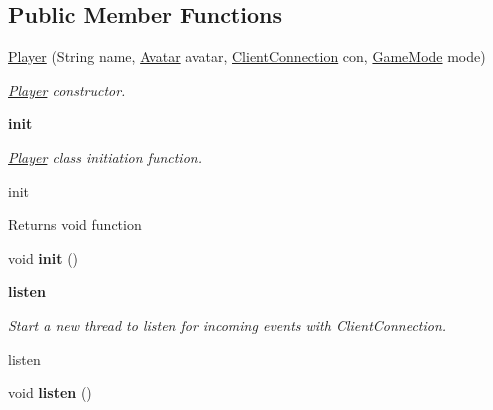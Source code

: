 \subsection*{Public Member Functions}
\begin{DoxyCompactItemize}
\item 
\hyperlink{classbattleship_1_1game_1_1Player_a4461129b3ce0b1bf218b91d05c5c3aa0}{Player} (String name, \hyperlink{classbattleship_1_1screen_1_1Avatar}{Avatar} avatar, \hyperlink{classbattleship_1_1network_1_1ClientConnection}{Client\+Connection} con, \hyperlink{enumbattleship_1_1game_1_1GameMode}{Game\+Mode} mode)
\begin{DoxyCompactList}\small\item\em \hyperlink{classbattleship_1_1game_1_1Player}{Player} constructor. \end{DoxyCompactList}\end{DoxyCompactItemize}
\begin{Indent}{\bf init}\par
{\em \hyperlink{classbattleship_1_1game_1_1Player}{Player} class initiation function.

init

\begin{DoxyReturn}{Returns}
void function 
\end{DoxyReturn}
}\begin{DoxyCompactItemize}
\item 
\hypertarget{classbattleship_1_1game_1_1Player_aa0b2ae0c4d2a3de2b80fe44102962d24}{}void {\bfseries init} ()\label{classbattleship_1_1game_1_1Player_aa0b2ae0c4d2a3de2b80fe44102962d24}

\end{DoxyCompactItemize}
\end{Indent}
\begin{Indent}{\bf listen}\par
{\em Start a new thread to listen for incoming events with Client\+Connection.

listen }\begin{DoxyCompactItemize}
\item 
\hypertarget{classbattleship_1_1game_1_1Player_af63b3429d6150bb6b7a7005346701c7b}{}void {\bfseries listen} ()\label{classbattleship_1_1game_1_1Player_af63b3429d6150bb6b7a7005346701c7b}

\end{DoxyCompactItemize}
\end{Indent}

